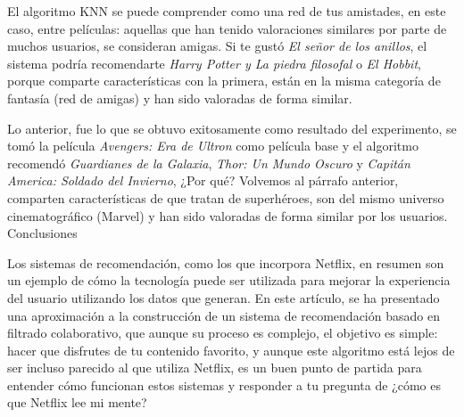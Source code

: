 \documentclass[letterpaper,10pt,final,hyphenatedtitles]{papertexKS}
\begin{document}
\begin{news}{2}
	El algoritmo KNN se puede comprender como una red de tus amistades, en este caso, entre películas: aquellas que han tenido valoraciones similares por parte de muchos usuarios, se consideran amigas. Si te gustó \textit{El señor de los anillos}, el sistema podría recomendarte \textit{Harry Potter y La piedra filosofal} o \textit{El Hobbit}, porque comparte características con la primera, están en la misma categoría de fantasía (red de amigas) y han sido valoradas de forma similar.

	Lo anterior, fue lo que se obtuvo exitosamente como resultado del experimento, se tomó la película \textit{Avengers: Era de Ultron} como película base y el algoritmo recomendó \textit{Guardianes de la Galaxia}, \textit{Thor: Un Mundo Oscuro} y \textit{Capitán America: Soldado del Invierno}, ¿Por qué? Volvemos al párrafo anterior, comparten características de que tratan de superhéroes, son del mismo universo cinematográfico (Marvel) y han sido valoradas de forma similar por los usuarios. 
	\\ 

	\noindent\textcolor{color}{\Large{Conclusiones}}

	Los sistemas de recomendación, como los que incorpora Netflix, en resumen son un ejemplo de cómo la tecnología puede ser utilizada para mejorar la experiencia del usuario utilizando los datos que generan. En este artículo, se ha presentado una aproximación a la construcción de un sistema de recomendación basado en filtrado colaborativo, que aunque su proceso es complejo, el objetivo es simple: hacer que disfrutes de tu contenido favorito, y aunque este algoritmo está lejos de ser incluso parecido al que utiliza Netflix, es un buen punto de partida para entender cómo funcionan estos sistemas y responder a tu pregunta de ¿cómo es que Netflix lee mi mente?

	\newssep

	
	

\end{news}
\newssep
\noindent
\end{document}
